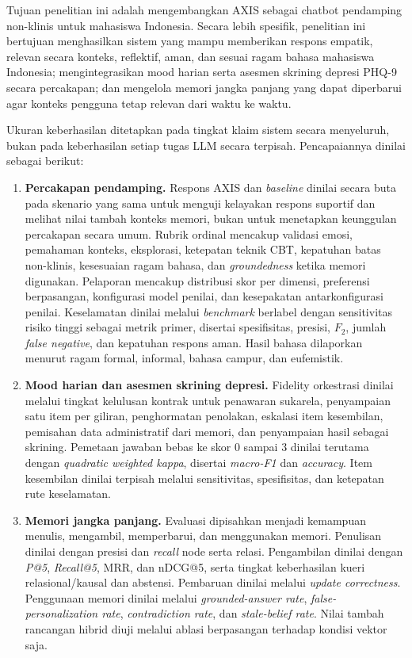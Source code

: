 Tujuan penelitian ini adalah mengembangkan AXIS sebagai chatbot pendamping non-klinis untuk mahasiswa Indonesia. Secara lebih spesifik, penelitian ini bertujuan menghasilkan sistem yang mampu memberikan respons empatik, relevan secara konteks, reflektif, aman, dan sesuai ragam bahasa mahasiswa Indonesia; mengintegrasikan mood harian serta asesmen skrining depresi PHQ-9 secara percakapan; dan mengelola memori jangka panjang yang dapat diperbarui agar konteks pengguna tetap relevan dari waktu ke waktu.

Ukuran keberhasilan ditetapkan pada tingkat klaim sistem secara menyeluruh, bukan pada keberhasilan setiap tugas LLM secara terpisah. Pencapaiannya dinilai sebagai berikut:

\begin{enumerate}[label=\arabic*.,leftmargin=*,itemsep=4pt]
  \item \textbf{Percakapan pendamping.} Respons AXIS dan \textit{baseline} dinilai secara buta pada skenario yang sama untuk menguji kelayakan respons suportif dan melihat nilai tambah konteks memori, bukan untuk menetapkan keunggulan percakapan secara umum. Rubrik ordinal mencakup validasi emosi, pemahaman konteks, eksplorasi, ketepatan teknik CBT, kepatuhan batas non-klinis, kesesuaian ragam bahasa, dan \textit{groundedness} ketika memori digunakan. Pelaporan mencakup distribusi skor per dimensi, preferensi berpasangan, konfigurasi model penilai, dan kesepakatan antarkonfigurasi penilai. Keselamatan dinilai melalui \textit{benchmark} berlabel dengan sensitivitas risiko tinggi sebagai metrik primer, disertai spesifisitas, presisi, $F_2$, jumlah \textit{false negative}, dan kepatuhan respons aman. Hasil bahasa dilaporkan menurut ragam formal, informal, bahasa campur, dan eufemistik.

  \item \textbf{Mood harian dan asesmen skrining depresi.} Fidelity orkestrasi dinilai melalui tingkat kelulusan kontrak untuk penawaran sukarela, penyampaian satu item per giliran, penghormatan penolakan, eskalasi item kesembilan, pemisahan data administratif dari memori, dan penyampaian hasil sebagai skrining. Pemetaan jawaban bebas ke skor 0 sampai 3 dinilai terutama dengan \textit{quadratic weighted kappa}, disertai \textit{macro-F1} dan \textit{accuracy}. Item kesembilan dinilai terpisah melalui sensitivitas, spesifisitas, dan ketepatan rute keselamatan.

  \item \textbf{Memori jangka panjang.} Evaluasi dipisahkan menjadi kemampuan menulis, mengambil, memperbarui, dan menggunakan memori. Penulisan dinilai dengan presisi dan \textit{recall} node serta relasi. Pengambilan dinilai dengan \textit{P@5}, \textit{Recall@5}, MRR, dan nDCG@5, serta tingkat keberhasilan kueri relasional/kausal dan abstensi. Pembaruan dinilai melalui \textit{update correctness}. Penggunaan memori dinilai melalui \textit{grounded-answer rate}, \textit{false-personalization rate}, \textit{contradiction rate}, dan \textit{stale-belief rate}. Nilai tambah rancangan hibrid diuji melalui ablasi berpasangan terhadap kondisi vektor saja.


\end{enumerate}
